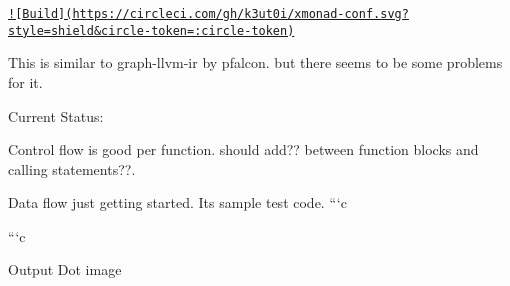 \href{https://circleci.com/gh/k3ut0i/llvm-dataflow-graphs}{\tt !\mbox{[}Build\mbox{]}(https\+://circleci.\+com/gh/k3ut0i/xmonad-\/conf.\+svg?style=shield\&circle-\/token=\+:circle-\/token)}

This is similar to graph-\/llvm-\/ir by pfalcon. but there seems to be some problems for it.

Current Status\+:
\begin{DoxyEnumerate}
\item Control flow is good per function. should add?? between function blocks and calling statements??.
\item Data flow just getting started. It\textquotesingle{}s sample test code. ```c 
 ```c
\end{DoxyEnumerate}

Output Dot image  